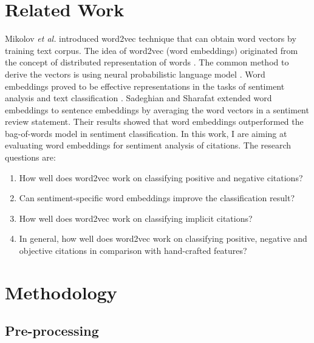 \documentclass[11pt]{llncs}
\begin{document}
\section{Related Work}
Mikolov \textit{et al.} introduced word2vec technique \cite{mikolov2013efficient} that can obtain word vectors by training text corpus. The idea of word2vec (word embeddings) originated from the concept of distributed representation of words \cite{Hinton86}. The common method to derive the vectors is using neural probabilistic language model \cite{bengio2003neural}. Word embeddings proved to be effective representations in the tasks of sentiment analysis \cite{tang2014learning,xue2014study,zhang2015chinese} and text classification \cite{lilleberg2015support}. Sadeghian and Sharafat \cite{sadeghianbag} extended word embeddings to sentence embeddings by averaging the word vectors in a sentiment review statement. Their results showed that word embeddings outperformed the bag-of-words model in sentiment classification. In this work, I are aiming at evaluating word embeddings for sentiment analysis of citations. The  research questions are:
\begin{enumerate} 
\item How well does word2vec work on classifying positive and negative citations?
\item Can sentiment-specific word embeddings improve the classification result?
\item How well does word2vec work on classifying implicit citations?
\item In general, how well does word2vec work on classifying positive, negative and objective citations in comparison with hand-crafted features?
\end{enumerate}
\section{Methodology}
\label{sec:methodology}

\subsection{Pre-processing}\label{sec:Pre-processing}
\end{document}
